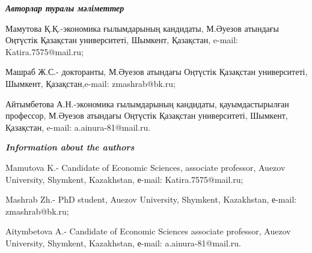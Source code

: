 \begin{info}
\hspace{1em}\emph{{\bfseries Авторлар туралы мәліметтер}}

Мамутова Қ.Қ.-экономика ғылымдарының кандидаты, М.Әуезов атындағы
Оңтүстік Қазақстан университеті, Шымкент, Қазақстан, e-mail:
Katira.7575@mail.ru;

Машраб Ж.С.- докторанты, М.Әуезов атындағы Оңтүстік Қазақстан
университеті, Шымкент, Қазақстан,e-mail: zmashrab@bk.ru;

Айтымбетова А.Н.-экономика ғылымдарының кандидаты, қауымдастырылған
профессор, М.Әуезов атындағы Оңтүстік Қазақстан университеті, Шымкент,
Қазақстан, e-mail: a.ainura-81@mail.ru.

\hspace{1em}\emph{{\bfseries Information about the authors}}

Mamutova K.- Candidate of Economic Sciences, associate professor,
Auezov University, Shymkent, Kazakhstan, е-mail: Katira.7575@mail.ru;

Mashrab Zh.- PhD student, Auezov University, Shymkent, Kazakhstan,
е-mail: zmashrab@bk.ru;

Aitymbetova A.- Candidate of Economic Sciences associate professor,
Auezov University, Shymkent, Kazakhstan, е-mail: a.ainura-81@mail.ru.
\end{info}
